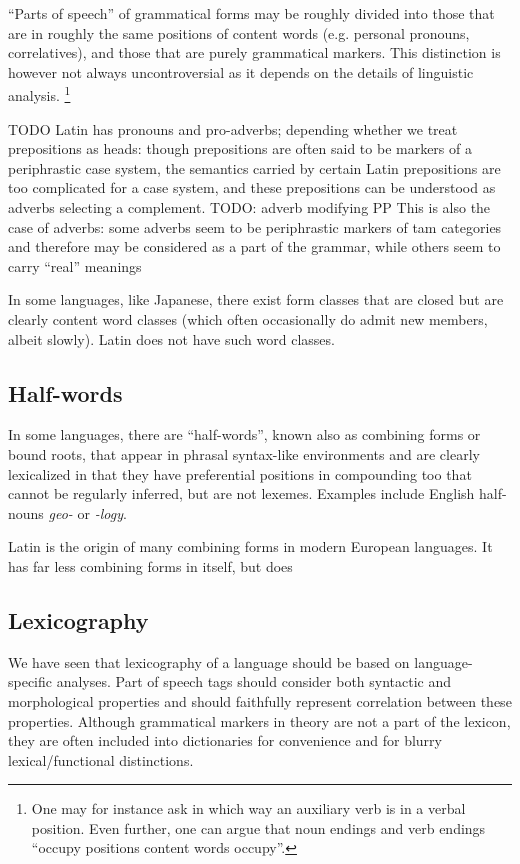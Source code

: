 \documentclass[a4paper, oneside, 12pt]{report}
\newcommand{\form}[1]{\emph{#1}}
\begin{document}
``Parts of speech'' of grammatical forms may be roughly divided into 
those that are in roughly the same positions of content words (e.g. personal pronouns, correlatives), and those that are purely grammatical markers.
This distinction is however not always uncontroversial as it depends on the details of linguistic analysis.%
\footnote{
    One may for instance ask in which way an auxiliary verb is in a verbal position.
    Even further, one can argue that noun endings and verb endings ``occupy positions content words occupy''.
}

TODO
Latin has pronouns and pro-adverbs; 
depending whether we treat prepositions as heads:
though prepositions are often said to be markers of a periphrastic case system,
the semantics carried by certain Latin prepositions are too complicated for a case system,
and these prepositions can be understood as adverbs selecting a complement.
TODO: adverb modifying PP  
This is also the case of adverbs:
some adverbs seem to be periphrastic markers of \acs{tam} categories
and therefore may be considered as a part of the grammar,
while others seem to carry ``real'' meanings

In some languages, like Japanese, there exist form classes that are closed but are clearly content word classes (which often occasionally do admit new members, albeit slowly).
Latin does not have such word classes.



\subsection{Half-words}\label{sec:grammatical.lexicon.half}

In some languages, there are ``half-words'', known also as combining forms or bound roots, that appear in phrasal syntax-like environments \citep{di2005decomposing,scher2014unifying} and are clearly lexicalized in that they have preferential positions in compounding too that cannot be regularly inferred, but are not lexemes.
Examples include English half-nouns \form{geo-} or \form{-logy}.

Latin is the origin of many combining forms in modern European languages.
It has far less combining forms in itself, but does 

\subsection{Lexicography}

We have seen that lexicography of a language should be based on language-specific analyses.
Part of speech tags should consider both syntactic and morphological properties
and should faithfully represent correlation between these properties.
Although grammatical markers in theory are not a part of the lexicon,
they are often included into dictionaries for convenience and for blurry lexical/functional distinctions.
\end{document}
